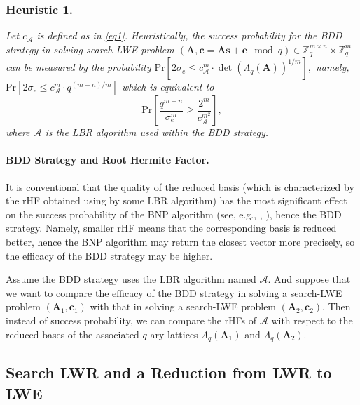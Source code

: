\documentclass[runningheads]{llncs}
\begin{document}
\subsubsection{Heuristic 1.} 
\textit{Let $c_{\mathcal{A}}$ is defined as in \eqref{eq1}. Heuristically, the success probability for the BDD strategy in solving search-LWE problem $(\mathbf{A}, \mathbf{c}=\mathbf{A}\mathbf{s}+\mathbf{e} \mod q) \in \mathbb{Z}_q^{m \times n} \times \mathbb{Z}_q^m$ can be measured by the probability
$\mathrm{Pr}\left[2\sigma_e \leq c_{\mathcal{A}}^m \cdot \det(\Lambda_q{(\mathbf{A})})^{1/m}\right],$
namely,
$\mathrm{Pr}\left[2\sigma_e \leq c_{\mathcal{A}}^m \cdot q^{(m-n)/m}\right]$
which is equivalent to
\begin{equation}\label{eqa}
\mathrm{Pr} \left[\frac{q^{m-n}}{\sigma_e^m} \geq  \frac{2^m}{c_{\mathcal{A}}^{m^2}}\right],
\end{equation}
where $\mathcal{A}$ is the LBR algorithm used within the BDD strategy.}

\paragraph{BDD Strategy and Root Hermite Factor.} It is conventional that the quality of the reduced basis (which is characterized by the rHF obtained using by some LBR algorithm) has the most significant effect on the success probability of the BNP algorithm (see, e.g., \cite[Section 5.4]{APS15}, \cite{BBD+15, GvVW17}), hence the BDD strategy. Namely, smaller rHF means that the corresponding basis is reduced better, hence the BNP algorithm may return the closest vector more precisely, so the efficacy of the BDD strategy may be higher.  

Assume the BDD strategy uses the LBR algorithm named $\mathcal{A}$.  And suppose that we want to compare the efficacy of the BDD strategy in solving a search-LWE problem $(\mathbf{A}_1, \mathbf{c}_1)$ with that in solving a search-LWE problem  $(\mathbf{A}_2, \mathbf{c}_2)$. Then instead of success probability, we can compare the rHFs of $\mathcal{A}$ with respect to the reduced bases of the associated $q$-ary lattices $\Lambda_q{(\mathbf{A}_1)}$ and $\Lambda_q{(\mathbf{A}_2)}$.
\subsection{Search LWR and a Reduction from LWR to LWE}
\end{document}
